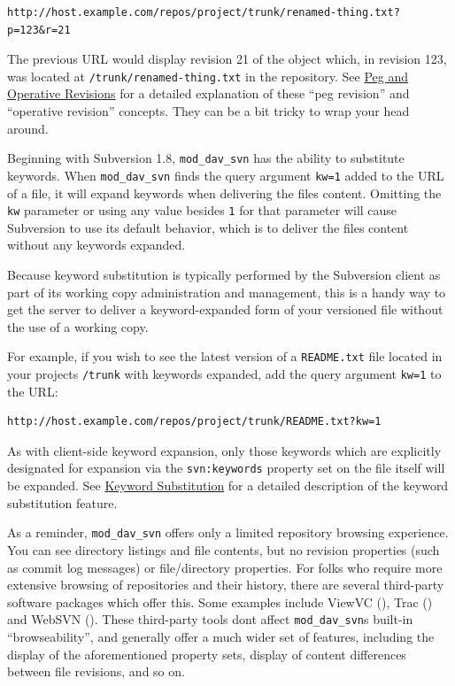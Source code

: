 \begin{verbatim}
http://host.example.com/repos/project/trunk/renamed-thing.txt?p=123&r=21
\end{verbatim}

The previous URL would display revision 21 of the object which, in
revision 123, was located at \texttt{/trunk/renamed-thing.txt} in the
repository. See \hyperref[svn.advanced.pegrevs]{Peg and Operative
Revisions} for a detailed explanation of these ``peg revision'' and
``operative revision'' concepts. They can be a bit tricky to wrap your
head around.

Beginning with Subversion 1.8, \texttt{mod\_dav\_svn} has the ability to
substitute keywords. When \texttt{mod\_dav\_svn} finds the query
argument \texttt{kw=1} added to the URL of a file, it will expand
keywords when delivering the file\textquotesingle s content. Omitting
the \texttt{kw} parameter or using any value besides \texttt{1} for that
parameter will cause Subversion to use its default behavior, which is to
deliver the file\textquotesingle s content without any keywords
expanded.

Because keyword substitution is typically performed by the Subversion
client as part of its working copy administration and management, this
is a handy way to get the server to deliver a keyword-expanded form of
your versioned file without the use of a working copy.

For example, if you wish to see the latest version of a
\texttt{README.txt} file located in your project\textquotesingle s
\texttt{/trunk} with keywords expanded, add the query argument
\texttt{kw=1} to the URL:

\begin{verbatim}
http://host.example.com/repos/project/trunk/README.txt?kw=1
\end{verbatim}

As with client-side keyword expansion, only those keywords which are
explicitly designated for expansion via the \texttt{svn:keywords}
property set on the file itself will be expanded. See
\hyperref[svn.advanced.props.special.keywords]{Keyword Substitution} for
a detailed description of the keyword substitution feature.

As a reminder, \texttt{mod\_dav\_svn} offers only a limited repository
browsing experience. You can see directory listings and file contents,
but no revision properties (such as commit log messages) or
file/directory properties. For folks who require more extensive browsing
of repositories and their history, there are several third-party
software packages which offer this. Some examples include ViewVC
(\href{https://viewvc.org}{}), Trac (\href{https://trac.edgewall.org}{})
and WebSVN (\href{https://websvnphp.github.io}{}). These third-party
tools don\textquotesingle t affect
\texttt{mod\_dav\_svn}\textquotesingle s built-in ``browseability'', and
generally offer a much wider set of features, including the display of
the aforementioned property sets, display of content differences between
file revisions, and so on.

